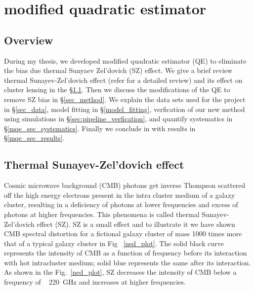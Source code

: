 \chapter{modified quadratic estimator}
\label{ch:analysis}
\section*{Overview}\label{ovr}
During my thesis, we developed modified quadratic estimator (QE) to eliminate the bias due thermal Sunyaev Zel'dovich (SZ) effect. 
We give a brief review thermal Sunayev-Zel'dovich effect (refer \cite{sunyaev70b} for a detailed review) and its effect on cluster lensing in the \S\ref{tsz}.
Then we discuss the modifications of the QE to remove SZ bias in \S\ref{sec_method}.
 We explain the data sets used for the project in \S\ref{sec_data}, model fitting in \S\ref{model_fitting}, verfication of our new method using simulations in \S\ref{sec:pipeline_verfication}, and quantify systematics in \S\ref{mqe_sec_systematics}.
Finally we conclude in with results in \S\ref{mqe_sec_results}.


\section{Thermal Sunayev-Zel'dovich effect}\label{tsz}

 Cosmic microwave background (CMB) photons get inverse Thompson scattered off the high energy electrons present in the intra cluster medium of a galaxy cluster, resulting in a deficiency of photons at lower frequencies and excess of photons at higher frequencies. 
 This phenomena is called thermal Sunayev-Zel'dovich effect (SZ). 
 SZ is a small effect and to illustrate it we have shown CMB spectral distortion for a fictional galaxy cluster of mass 1000 times more that of a typical galaxy cluster in Fig ~\ref{ned_plot}.
 The solid black curve represents the intensity of CMB as a function of frequency before its interaction with hot intracluster medium; solid blue represents the same after its interaction.
 As shown in the Fig.~\ref{ned_plot}, SZ decreases the intensity of CMB below a frequency of ~ 220 \,GHz and increases at higher frequencies. 
   
